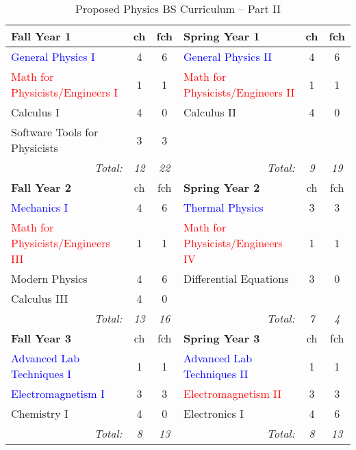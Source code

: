 \documentclass[12pt,preprint]{aastex}
\newcommand{\red}[1]{\textcolor{red}{#1}}
\newcommand{\blue}[1]{\textcolor{blue}{#1}}
\begin{document}
\begin{longtable}{lcclcc}
\caption{Proposed Physics BS Curriculum -- Part II}\label{table:bs2} \\
\hline
{\bf Fall Year 1} & {\sc ch} & {\sc fch} & {\bf Spring Year 1} & {\sc ch} & {\sc fch}  \\ 
\hline
\hline
\blue{General Physics I}                 & 4 & 6 & \blue{General Physics II} & 4 & 6 \\
\red{Math for Physicists/Engineers I} & 1 &  1 & \red{Math for Physicists/Engineers II} & 1 & 1 \\ 
Calculus I                               & 4 &  0 & Calculus II & 4 & 0 \\
Software Tools for Physicists            & 3 &  3 &             &   &   \\
\multicolumn{1}{r}{\emph{Total:}} & \emph{12} & \emph{22} &
\multicolumn{1}{r}{\emph{Total:}} & \emph{9}  & \emph{19} \\

\hline
{\bf Fall Year 2} & {\sc ch} & {\sc fch} & {\bf Spring Year 2} & {\sc ch} & {\sc fch} \\ 
\hline
\hline
\blue{Mechanics I}                      & 4 & 6 & \blue{Thermal Physics} & 3 & 3 \\
\red{Math for Physicists/Engineers III} & 1 & 1 & \red{Math for Physicists/Engineers IV} & 1 & 1 \\ 
Modern Physics                          & 4 & 6 & Differential Equations & 3 & 0 \\
Calculus III                            & 4 & 0 & \\
\multicolumn{1}{r}{\emph{Total:}} & \emph{13} & \emph{16} &
\multicolumn{1}{r}{\emph{Total:}} & \emph{7}  & \emph{4} \\

\hline
{\bf Fall Year 3} & {\sc ch} & {\sc fch} & {\bf Spring Year 3} & {\sc ch} & {\sc fch}  \\ 
\hline
\hline
\blue{Advanced Lab Techniques I} & 1 & 1 & \blue{Advanced Lab Techniques II} & 1 & 1 \\
\blue{Electromagnetism I}        & 3 & 3 & \red{Electromagnetism II}         & 3 & 3 \\
Chemistry I                      & 4 & 0 & Electronics I                     & 4 & 6 \\
\multicolumn{1}{r}{\emph{Total:}} & \emph{8} & \emph{13} &
\multicolumn{1}{r}{\emph{Total:}} & \emph{8}  & \emph{13} \\


\end{longtable}
\end{document}

